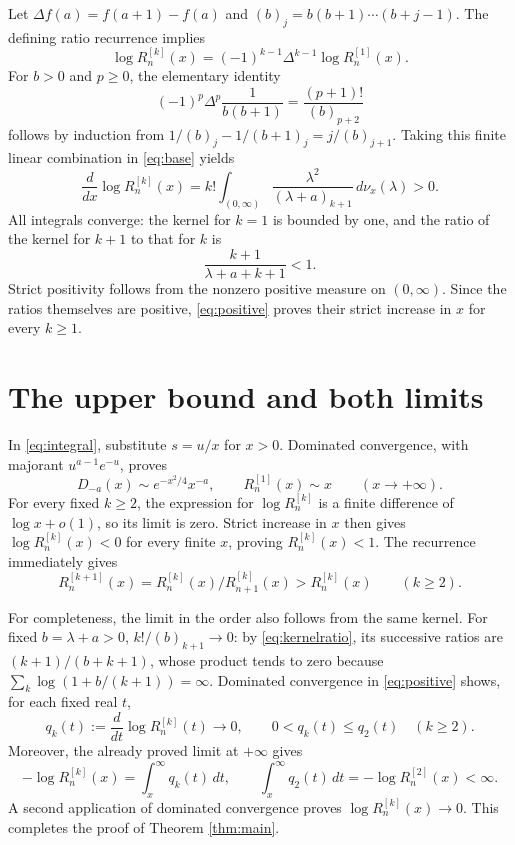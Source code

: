 \documentclass[11pt]{article}
\newcommand{\dd}{\,d}
\begin{document}
Let $\Delta f(a)=f(a+1)-f(a)$ and $(b)_j=b(b+1)\cdots(b+j-1)$.
The defining ratio recurrence implies
\[
 \log R_n^{[k]}(x)=(-1)^{k-1}\Delta^{k-1}
                        \log R_n^{[1]}(x).
\]
For $b>0$ and $p\ge0$, the elementary identity
\begin{equation}\label{eq:fd}
 (-1)^p\Delta^p\frac1{b(b+1)}=\frac{(p+1)!}{(b)_{p+2}}
\end{equation}
follows by induction from
$1/(b)_j-1/(b+1)_j=j/(b)_{j+1}$.
Taking this finite linear combination in \eqref{eq:base} yields
\begin{equation}\label{eq:positive}
 \boxed{\quad
 \frac{d}{dx}\log R_n^{[k]}(x)=
 k!\int_{(0,\infty)}
 \frac{\lambda^2}{(\lambda+a)_{k+1}}\dd\nu_x(\lambda)>0.
 \quad}
\end{equation}
All integrals converge: the kernel for $k=1$ is bounded by one, and the
ratio of the kernel for $k+1$ to that for $k$ is
\begin{equation}\label{eq:kernelratio}
 \frac{k+1}{\lambda+a+k+1}<1.
\end{equation}
Strict positivity follows from the nonzero positive measure on $(0,\infty)$.
Since the ratios themselves are positive, \eqref{eq:positive} proves their
strict increase in $x$ for every $k\ge1$.

\section*{The upper bound and both limits}
In \eqref{eq:integral}, substitute $s=u/x$ for $x>0$.
Dominated convergence, with majorant $u^{a-1}e^{-u}$, proves
\[
 D_{-a}(x)\sim e^{-x^2/4}x^{-a},\qquad
 R_n^{[1]}(x)\sim x\qquad(x\to+\infty).
\]
For every fixed $k\ge2$, the expression for $\log R_n^{[k]}$ is a finite
difference of $\log x+o(1)$, so its limit is zero. Strict increase in $x$
then gives $\log R_n^{[k]}(x)<0$ for every finite $x$, proving
$R_n^{[k]}(x)<1$. The recurrence immediately gives
\[
 R_n^{[k+1]}(x)=R_n^{[k]}(x)/R_{n+1}^{[k]}(x)>R_n^{[k]}(x)
 \qquad(k\ge2).
\]

For completeness, the limit in the order also follows from the same
kernel. For fixed $b=\lambda+a>0$,
$k!/(b)_{k+1}\to0$: by \eqref{eq:kernelratio}, its successive ratios
are $(k+1)/(b+k+1)$, whose product tends to zero because
$\sum_k\log(1+b/(k+1))=\infty$.
Dominated convergence in \eqref{eq:positive} shows, for each fixed real $t$,
\[
 q_k(t):=\frac{d}{dt}\log R_n^{[k]}(t)\longrightarrow0,
 \qquad 0<q_k(t)\le q_2(t)\quad(k\ge2).
\]
Moreover, the already proved limit at $+\infty$ gives
\[
 -\log R_n^{[k]}(x)=\int_x^\infty q_k(t)\dd t,
 \qquad \int_x^\infty q_2(t)\dd t=-\log R_n^{[2]}(x)<\infty.
\]
A second application of dominated convergence proves
$\log R_n^{[k]}(x)\to0$. This completes the proof of Theorem
\ref{thm:main}.
\end{document}
